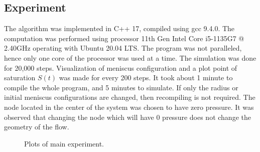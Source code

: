 \documentclass{crm-article}
\begin{document}
		\subsection{Experiment} \label{sec:exp-main}
			The algorithm was implemented in C++ 17, compiled using gcc 9.4.0. The computation was performed using processor 11th Gen Intel Core i5-1135G7 @ 2.40GHz operating with Ubuntu 20.04 LTS. The program was not paralleled, hence only one core of the processor was used at a time.  The simulation was done for 20,000 steps. Visualization of meniscus configuration and a plot point of saturation $S(t)$ was made for every 200 steps. It took about 1 minute to compile the whole program, and 5 minutes to simulate. If only the radius or initial meniscus configurations are changed, then recompiling is not required. The node located in the center of the system was chosen to have zero pressure. It was observed that changing the node which will have 0 pressure does not change the geometry of the flow.
			
			\begin{figure}[H]
				\centering
				\hfill
				\caption{Plots of main experiment.}
			\end{figure}
			
\end{document}
